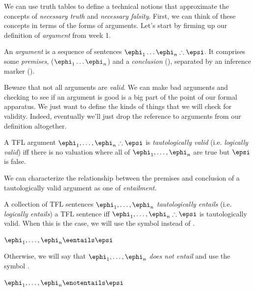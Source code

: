 We can use truth tables to define a technical notions that approximate the
concepts of \emph{necessary truth} and \emph{necessary falsity}. First, we can
think of these concepts in terms of the forms of arguments. Let's start by
firming up our definition of \emph{argument} from week 1.

\begin{definition}[Argument]
  \label{def:tfl-argument}
  An \emph{argument} is a sequence of sentences
  $\ephi_1\dots\ephi_n \therefore \epsi$. It comprises some \emph{premises},
  ($\ephi_1\dots\ephi_n$) and a \emph{conclusion} (\epsi), separated by an
  inference marker (\therefore).
\end{definition}

Beware that not all arguments are \emph{valid}. We can make bad arguments and
checking to see if an argument is good is a big part of the point of our formal
apparatus. We just want to define the kinds of things that we will check for
validity. Indeed, eventually we'll just drop the reference to arguments from our
definition altogether.

\begin{definition}
  \label{def:tfl-tautologically-valid}
  A TFL argument $\ephi_1,\dots,\ephi_n \therefore \epsi$ is
  \emph{tautologically valid} (i.e. \emph{logically valid}) iff there is no
  valuation where all of $\ephi_1,\dots,\ephi_n$ are true but $\epsi$ is false.
\end{definition}

We can characterize the relationship between the premises and conclusion of
a tautologically valid argument as one of \emph{entailment}.

\begin{definition}
  \label{def:tfl-tautologically-entail}
  A collection of TFL sentences $\ephi_1,\dots,\ephi_n$ \emph{tautologically
  entails} (i.e. \emph{logically entails}) a TFL sentence \epsi iff
  $\ephi_1,\dots,\ephi_n \therefore \epsi$ is tautologically valid. When this
  is the case, we will use the symbol \eentails instead of \therefore.

  \begin{argument}
    \item[ ] $\ephi_1,\dots,\ephi_n \eentails \epsi$
  \end{argument}

  Otherwise, we will say that $\ephi_1,\dots,\ephi_n$ \emph{does not entail}
  \epsi and use the symbol \enotentails.

    \begin{argument}
    \item[ ] $\ephi_1,\dots,\ephi_n \enotentails \epsi$
    \end{argument}
\end{definition}


